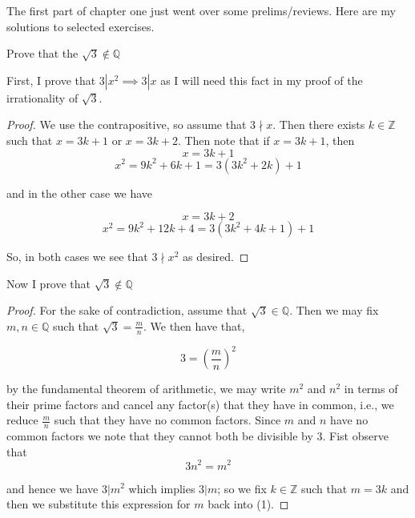\documentclass[11pt,largemargins]{homework}
\newcommand{\Q}{\mathbb{Q}}
\newcommand{\Z}{\mathbb{Z}}
\begin{document}
\maketitle
The first part of chapter one just went over some prelims/reviews. Here are my solutions to selected exercises. 
\question
    \begin{alphaparts}
        \questionpart
            Prove that the $\sqrt{3} \notin \Q$
            
            First, I prove that $3|x^2 \implies 3|x$ as I will need this fact in my proof of the irrationality of $\sqrt{3}$. 
            
            \begin{proof}
                We use the contrapositive, so assume that $3\nmid x$. Then there exists $k \in \Z$ such that $x = 3k + 1$ or $ x = 3k + 2$. Then note that if $x = 3k + 1$, then 
                \[ x = 3k + 1 \] 
                \[ x^2 = 9k^2 + 6k + 1 = 3(3k^2 + 2k) + 1\]
                
                and in the other case we have
                
                \[ x = 3k + 2 \] 
                \[ x^2 = 9k^2 + 12k + 4 = 3(3k^2 + 4k + 1) + 1 \] 
                
                So, in both cases we see that $3\nmid x^2$ as desired. 
            \end{proof}
            
            Now I prove that $\sqrt{3} \notin \Q$ 
            \begin{proof}
                For the sake of contradiction, assume that $\sqrt{3} \in \Q$. Then we may fix $m, n \in \Q$ such that $\sqrt{3} = \frac{m}{n}$. We then have that, 
                
                \[ 3 = \left(\frac{m}{n}\right)^2 \] 
                
                by the fundamental theorem of arithmetic, we may write $m^2$ and $n^2$ in terms of their prime factors and cancel any factor(s) that they have in common, i.e., we reduce $\frac{m}{n}$ such that they have no common factors. Since $m$ and $n$ have no common factors we note that they cannot both be divisible by 3. Fist observe that 
                \begin{equation}
                    3n^2 = m^2
                \end{equation}
                
                
                and hence we have $3| m^2$ which implies $3|m$; so we fix $k \in \Z$ such that $ m = 3k$ and then we substitute this expression for $m$ back into (1). 
                

\end{proof}
\end{alphaparts}
\end{document}
